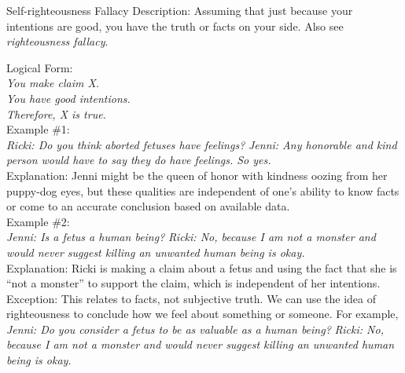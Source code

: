 \documentclass[a4paper,12pt,single,pdftex]{scrartcl}
\begin{document}
Self-righteousness Fallacy
    Description: Assuming that just because your intentions are good, you have the truth or facts on your side. Also see {\it righteousness fallacy}.

    
      Logical Form:
    \\

    
      {\em You make claim X.}
    \\

    
      {\em You have good intentions.}
    \\

    
      {\em Therefore, X is true.}
    \\

    
      Example \#1:
    \\

    
      {\em Ricki: Do you think aborted fetuses have feelings?} \newline
{\em Jenni: Any honorable and kind person would have to say they do have feelings. So yes.}
    \\

    
      Explanation: Jenni might be the queen of honor with kindness oozing from her puppy-dog eyes, but these qualities are independent of one’s ability to know facts or come to an accurate conclusion based on available data.
    \\

    
      Example \#2:
    \\

    
      {\em Jenni: Is a fetus a human being?} \newline
{\em Ricki: No, because I am not a monster and would never suggest killing an unwanted human being is okay.}
    \\

    
      Explanation: Ricki is making a claim about a fetus and using the fact that she is “not a monster” to support the claim, which is independent of her intentions.
    \\

    
      Exception: This relates to facts, not subjective truth. We can use the idea of righteousness to conclude how we feel about something or someone. For example,
    \\

    
      {\em Jenni: Do you consider a fetus to be as valuable as a human being?} \newline
{\em Ricki: No, because I am not a monster and would never suggest killing an unwanted human being is okay.}
    \\
\end{document}
